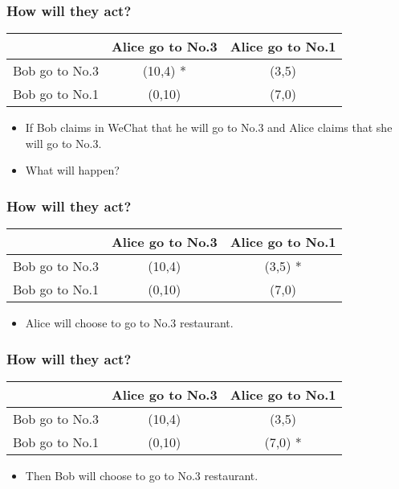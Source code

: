 \documentclass{beamer}
\begin{document}
\begin{frame}
\frametitle{How will they act?}
\begin{tabular}{|c|c|c|}
\hline
\hline
    & {\color{red}Alice} go to No.3 & {\color{red}Alice} go to No.1\\
\hline
{\color{blue}Bob} go to No.3 & ({\color{blue}10},{\color{red}4}) {\color{green}*}& ({\color{blue}3},{\color{red}5})\\
\hline
{\color{blue}Bob} go to No.1 & ({\color{blue}0},{\color{red}10}) & ({\color{blue}7},{\color{red}0})\\
\hline
\hline
\end{tabular}
\begin{itemize}
\item  
If {\color{blue}Bob} claims in WeChat that he will go to No.3 and {\color{red}Alice} claims that she will go to No.3.

\item What will happen?
\end{itemize}
\end{frame}

\begin{frame}
\frametitle{How will they act?}
\begin{tabular}{|c|c|c|}
\hline
\hline
    & {\color{red}Alice} go to No.3 & {\color{red}Alice} go to No.1\\
\hline
{\color{blue}Bob} go to No.3 & ({\color{blue}10},{\color{red}4})& ({\color{blue}3},{\color{red}5})  {\color{green}*}\\
\hline
{\color{blue}Bob} go to No.1 & ({\color{blue}0},{\color{red}10}) & ({\color{blue}7},{\color{red}0})\\
\hline
\hline
\end{tabular}
\begin{itemize}
\item {\color{red}Alice} will choose to go to No.3 restaurant.
\end{itemize}
\end{frame}

\begin{frame}
\frametitle{How will they act?}
\begin{tabular}{|c|c|c|}
\hline
\hline
    & {\color{red}Alice} go to No.3 & {\color{red}Alice} go to No.1\\
\hline
{\color{blue}Bob} go to No.3 & ({\color{blue}10},{\color{red}4})& ({\color{blue}3},{\color{red}5})\\
\hline
{\color{blue}Bob} go to No.1 & ({\color{blue}0},{\color{red}10}) & ({\color{blue}7},{\color{red}0}) {\color{green}*}\\
\hline
\hline
\end{tabular}
\begin{itemize}
\item Then {\color{blue}Bob} will choose to go to No.3 restaurant.
\end{itemize}
\end{frame}
\end{document}
